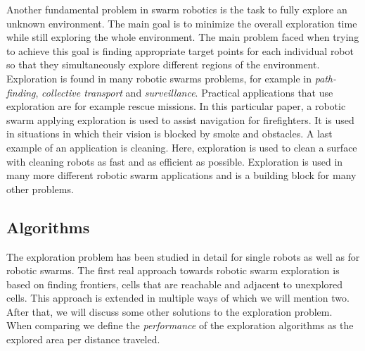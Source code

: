 
Another fundamental problem in swarm robotics is the task to fully explore an unknown environment.
The main goal is to minimize the overall exploration time while still exploring the whole environment. 
The main problem faced when trying to achieve this goal is finding appropriate target points for each individual robot so that they simultaneously explore different regions of the environment. \cite{burgard2005coordinated} \\
Exploration is found in many robotic swarms problems, for example in \emph{path-finding}, \emph{collective transport} and \emph{surveillance}.
Practical applications that use exploration are for example rescue missions. \cite{Naghsh2008,Penders2011}
In this particular paper, a robotic swarm applying exploration is used to assist navigation for firefighters.
It is used in situations in which their vision is blocked by smoke and obstacles. 
A last example of an application is cleaning. \cite{wagner2008cooperative}
Here, exploration is used to clean a surface with cleaning robots as fast and as efficient as possible. 
Exploration is used in many more different robotic swarm applications and is a building block for many other problems.

 

\subsection{Algorithms}
The exploration problem has been studied in detail for single robots \cite{lee1997quantitative,albers1999exploring} as well as for robotic swarms.
The first real approach towards robotic swarm exploration is based on finding frontiers, cells that are reachable and adjacent to unexplored cells. \cite{yamauchi1998frontier} This approach is extended in multiple ways of which we will mention two. \cite{solanas2004coordinated,sheng2006distributed}
After that, we will discuss some other solutions to the exploration problem. \cite{singh1993map,zlot2002multi}
When comparing we define the \emph{performance} of the exploration algorithms as the explored area per distance traveled.

